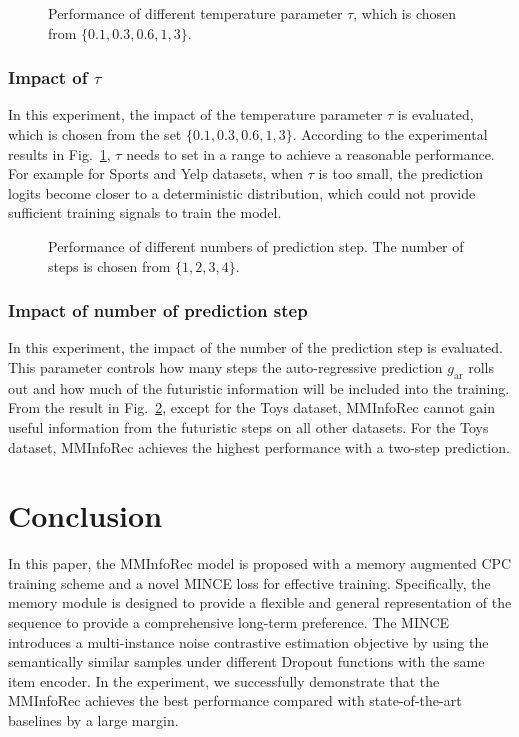 \documentclass[conference]{IEEEtran}
\begin{document}
\begin{figure}[t]
    \centering
    \caption{Performance of different temperature parameter $\tau$, which is chosen from $\{0.1,0.3,0.6,1,3\}$.}
\label{fig:tau-param}
\end{figure}

\subsubsection{Impact of $\tau$}
In this experiment, the impact of the temperature parameter $\tau$ is evaluated, which is chosen from the set $\{0.1,0.3,0.6,1,3\}$. According to the experimental results in Fig.~\ref{fig:tau-param}, $\tau$ needs to set in a range to achieve a reasonable performance. For example for Sports and Yelp datasets, when $\tau$ is too small, the prediction logits become closer to a deterministic distribution, which could not provide sufficient training signals to train the model.

\begin{figure}[t]
    \centering
    \caption{Performance of different numbers of prediction step. The number of steps is chosen from $\{1,2,3,4\}$.}
\label{fig:pred-param}
\end{figure}

\subsubsection{Impact of number of prediction step}
In this experiment, the impact of the number of the prediction step is evaluated. This parameter controls how many steps the auto-regressive prediction $g_\text{ar}$ rolls out and how much of the futuristic information will be included into the training. From the result in Fig.~\ref{fig:pred-param}, except for the Toys dataset, MMInfoRec cannot gain useful information from the futuristic steps on all other datasets. For the Toys dataset, MMInfoRec achieves the highest performance with a two-step prediction.

\section{Conclusion}
\label{sec:conc}
In this paper, the MMInfoRec model is proposed with a memory augmented CPC training scheme and a novel MINCE loss for effective training. Specifically, the memory module is designed to provide a flexible and general representation of the sequence to provide a comprehensive long-term preference. The MINCE introduces a multi-instance noise contrastive estimation objective by using the semantically similar samples under different Dropout functions with the same item encoder. In the experiment, we successfully demonstrate that the MMInfoRec achieves the best performance compared with state-of-the-art baselines by a large margin.
\end{document}
